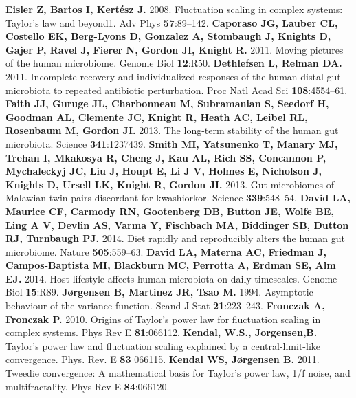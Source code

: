 \documentclass[12pt,oneside,letterpaper]{article}
\begin{document}
\begin{thebibliography}{99}
 {\bf Eisler Z, Bartos I, Kertész J.} 2008. Fluctuation scaling in complex systems: Taylor’s law and beyond1. Adv Phys {\bf 57}:89–142.
 {\bf Caporaso JG, Lauber CL, Costello EK, Berg-Lyons D, Gonzalez A, Stombaugh J, Knights D, Gajer P, Ravel J, Fierer N, Gordon JI, Knight R.} 2011. Moving pictures of the human microbiome. Genome Biol {\bf 12}:R50.
 {\bf Dethlefsen L, Relman DA.} 2011. Incomplete recovery and individualized responses of the human distal gut microbiota to repeated antibiotic perturbation. Proc Natl Acad Sci {\bf108}:4554–61.
 {\bf Faith JJ, Guruge JL, Charbonneau M, Subramanian S, Seedorf H, Goodman AL, Clemente JC, Knight R, Heath AC, Leibel RL, Rosenbaum M, Gordon JI.} 2013. The long-term stability of the human gut microbiota. Science {\bf 341}:1237439.
 {\bf Smith MI, Yatsunenko T, Manary MJ, Trehan I, Mkakosya R, Cheng J, Kau AL, Rich SS, Concannon P, Mychaleckyj JC, Liu J, Houpt E, Li J V, Holmes E, Nicholson J, Knights D, Ursell LK, Knight R, Gordon JI.} 2013. Gut microbiomes of Malawian twin pairs discordant for kwashiorkor. Science {\bf 339}:548–54.
 {\bf David LA, Maurice CF, Carmody RN, Gootenberg DB, Button JE, Wolfe BE, Ling A V, Devlin AS, Varma Y, Fischbach MA, Biddinger SB, Dutton RJ, Turnbaugh PJ.} 2014. Diet rapidly and reproducibly alters the human gut microbiome. Nature {\bf 505}:559–63.
 {\bf David LA, Materna AC, Friedman J, Campos-Baptista MI, Blackburn MC, Perrotta A, Erdman SE, Alm EJ.} 2014. Host lifestyle affects human microbiota on daily timescales. Genome Biol {\bf 15}:R89.
 {\bf Jørgensen B, Martinez JR, Tsao M.} 1994. Asymptotic behaviour of the variance function. Scand J Stat {\bf 21}:223–243.
 {\bf Fronczak A, Fronczak P.} 2010. Origins of Taylor’s power law for fluctuation scaling in complex systems. Phys Rev E {\bf 81}:066112.
 {\bf Kendal, W.S., Jorgensen,B.} Taylor's power law and fluctuation scaling explained by a central-limit-like convergence.  Phys. Rev. E {\bf 83} 066115.
 {\bf Kendal WS, Jørgensen B.} 2011. Tweedie convergence: A mathematical basis for Taylor’s power law, 1/f noise, and multifractality. Phys Rev E {\bf 84}:066120.


\end{thebibliography}
\end{document}
